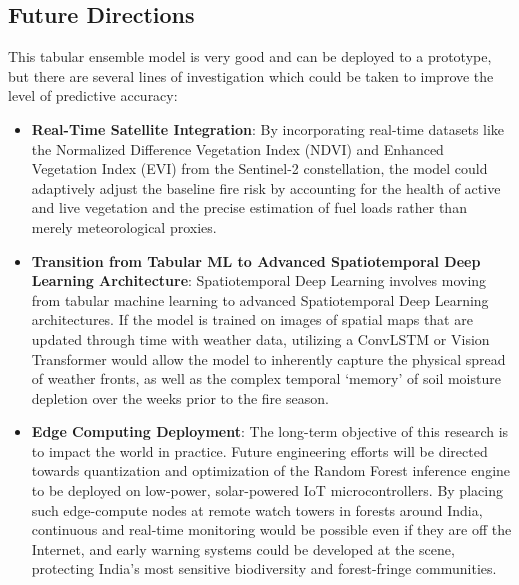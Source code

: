 \documentclass[journal, 10pt, twocolumn]{IEEEtran}
\begin{document}
\subsection{Future Directions}
This tabular ensemble model is very good and can be deployed to a prototype, but there are several lines of investigation which could be taken to improve the level of predictive accuracy:

\begin{itemize}
    \item \textbf{Real-Time Satellite Integration}: By incorporating real-time datasets like the Normalized Difference Vegetation Index (NDVI) and Enhanced Vegetation Index (EVI) from the Sentinel-2 constellation, the model could adaptively adjust the baseline fire risk by accounting for the health of active and live vegetation and the precise estimation of fuel loads rather than merely meteorological proxies.

    \item \textbf{Transition from Tabular ML to Advanced Spatiotemporal Deep Learning Architecture}: Spatiotemporal Deep Learning involves moving from tabular machine learning to advanced Spatiotemporal Deep Learning architectures. If the model is trained on images of spatial maps that are updated through time with weather data, utilizing a ConvLSTM or Vision Transformer would allow the model to inherently capture the physical spread of weather fronts, as well as the complex temporal `memory' of soil moisture depletion over the weeks prior to the fire season.

    \item \textbf{Edge Computing Deployment}: The long-term objective of this research is to impact the world in practice. Future engineering efforts will be directed towards quantization and optimization of the Random Forest inference engine to be deployed on low-power, solar-powered IoT microcontrollers. By placing such edge-compute nodes at remote watch towers in forests around India, continuous and real-time monitoring would be possible even if they are off the Internet, and early warning systems could be developed at the scene, protecting India's most sensitive biodiversity and forest-fringe communities.
\end{itemize}
\end{document}
